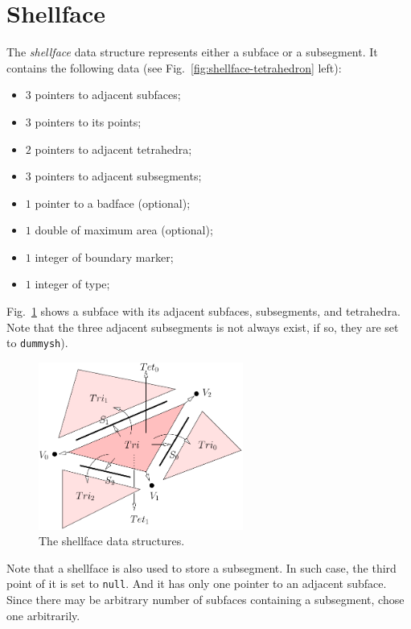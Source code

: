 \section{Shellface}

The {\it shellface} data structure represents either a subface or a subsegment. It contains the following data (see Fig.~\ref{fig:shellface-tetrahedron} left):
\begin{itemize}
\item $3$ pointers to adjacent subfaces;
\item $3$ pointers to its points;
\item $2$ pointers to adjacent tetrahedra;
\item $3$ pointers to adjacent subsegments;
\item $1$ pointer to a badface (optional);
\item $1$ double of maximum area (optional);
\item $1$ integer of boundary marker;
\item $1$ integer of type;
\end{itemize}

Fig.~\ref{fig:shellface} shows a subface with its adjacent subfaces, subsegments, and tetrahedra. Note that the three adjacent subsegments is not always exist, if so, they are set to {\tt dummysh}). 

\begin{figure}
  \centering
  \includegraphics[width=0.6\textwidth]{../figs/triang-edge-ds}
\caption{The shellface data structures.}
\label{fig:shellface}
\end{figure}

Note that a shellface is also used to store a subsegment. In such case, the third point of it is set to {\tt null}. And it has only one pointer to an adjacent subface.  Since there may be arbitrary number of subfaces containing a subsegment, chose one arbitrarily.


